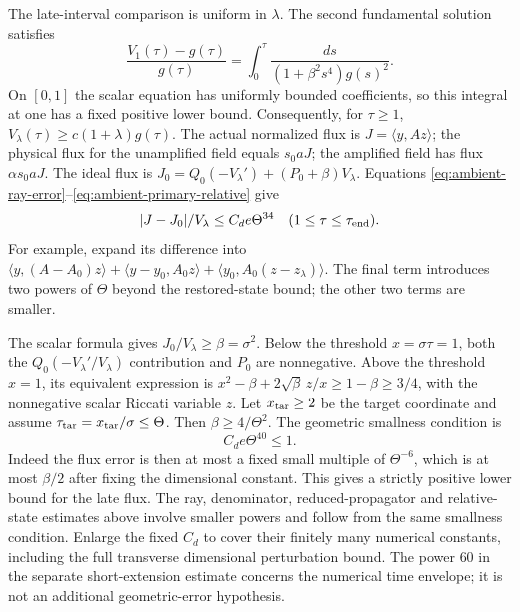 \documentclass[11pt]{article}
\theoremstyle{definition}
\begin{document}
The late-interval comparison is uniform in $\lambda$.
The second fundamental solution satisfies
\[
 \frac{V_1(\tau)-g(\tau)}{g(\tau)}
   =\int_0^\tau\frac{ds}{(1+\beta^2s^4)g(s)^2}.
\]
On $[0,1]$ the scalar equation has uniformly bounded coefficients,
so this integral at one has a fixed positive lower bound.
Consequently, for $\tau\geq1$,
$V_\lambda(\tau)\geq c(1+\lambda)g(\tau)$.
The actual normalized flux is $J=\langle y,Az\rangle$; the physical
flux for the unamplified field equals $s_0aJ$; the amplified field has
flux $\alpha s_0aJ$.
The ideal flux is
$J_0=Q_0(-V_\lambda')+(P_0+\beta)V_\lambda$.
Equations \eqref{eq:ambient-ray-error}--\eqref{eq:ambient-primary-relative}
give
\begin{equation}\label{eq:ambient-flux-relative}
 |J-J_0|/V_\lambda\leq C_de\Theta^{34}
 \quad(1\leq\tau\leq\tau_{\rm end}).
\end{equation}
For example, expand its difference into
$\langle y,(A-A_0)z\rangle+
 \langle y-y_0,A_0z\rangle+
 \langle y_0,A_0(z-z_\lambda)\rangle$.
The final term introduces two powers of $\Theta$ beyond the restored-state
bound; the other two terms are smaller.

The scalar formula gives $J_0/V_\lambda\geq\beta=\sigma^2$.
Below the threshold $x=\sigma\tau=1$, both the
$Q_0(-V_\lambda'/V_\lambda)$ contribution and $P_0$ are nonnegative.
Above the threshold $x=1$, its equivalent expression is
$x^2-\beta+2\sqrt\beta\,z/x\geq1-\beta\geq3/4$, with the
nonnegative scalar Riccati variable $z$.
Let $x_{\rm tar}\geq2$ be the target coordinate and assume
$\tau_{\rm tar}=x_{\rm tar}/\sigma\leq\Theta$.
Then $\beta\geq4/\Theta^2$.
The geometric smallness condition is
\begin{equation}\label{eq:ambient-forty-guard}
 C_de\Theta^{40}\leq1.
\end{equation}
Indeed the flux error is then at most a fixed small multiple of
$\Theta^{-6}$, which is at most $\beta/2$ after fixing the dimensional
constant. This gives a strictly positive lower bound for the late flux.
The ray, denominator, reduced-propagator and relative-state estimates above
involve smaller powers and follow from the same smallness condition.
Enlarge the fixed $C_d$ to cover their finitely many numerical constants, including
the full transverse dimensional perturbation bound. The power $60$
in the separate short-extension estimate concerns the numerical time
envelope; it is not an additional geometric-error hypothesis.
\end{document}
